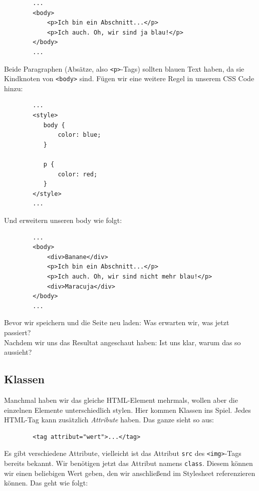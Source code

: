 \documentclass[11pt]{article}
\begin{document}
    \begin{verbatim}
        ...
        <body>
            <p>Ich bin ein Abschnitt...</p>
            <p>Ich auch. Oh, wir sind ja blau!</p>
        </body>
        ...
    \end{verbatim}

    Beide Paragraphen (Absätze, also \Verb"<p>"-Tags) sollten blauen Text haben, da sie Kindknoten von \Verb"<body>" sind.
    Fügen wir eine weitere Regel in unserem CSS Code hinzu:

    \begin{verbatim}
        ...
        <style>
           body {
               color: blue;
           }

           p {
               color: red;
           }
        </style>
        ...
    \end{verbatim}

    Und erweitern unseren body wie folgt:

    \begin{verbatim}
        ...
        <body>
            <div>Banane</div>
            <p>Ich bin ein Abschnitt...</p>
            <p>Ich auch. Oh, wir sind nicht mehr blau!</p>
            <div>Maracuja</div>
        </body>
        ...
    \end{verbatim}

    Bevor wir speichern und die Seite neu laden: Was erwarten wir, was jetzt passiert? \\
    Nachdem wir uns das Resultat angeschaut haben: Ist uns klar, warum das so aussieht?

    \subsection{Klassen}

    Manchmal haben wir das gleiche HTML-Element mehrmals, wollen aber die einzelnen Elemente unterschiedlich
    stylen.
    Hier kommen Klassen ins Spiel.
    Jedes HTML-Tag kann zusätzlich \textit{Attribute} haben.
    Das ganze sieht so aus:

    \begin{verbatim}
        <tag attribut="wert">...</tag>
    \end{verbatim}

    Es gibt verschiedene Attribute, vielleicht ist das Attribut \Verb"src" des \Verb"<img>"-Tags bereits bekannt.
    Wir benötigen jetzt das Attribut namens \Verb"class".
    Diesem können wir einen beliebigen Wert geben, den wir anschließend im Stylesheet referenzieren können.
    Das geht wie folgt:
\end{document}
